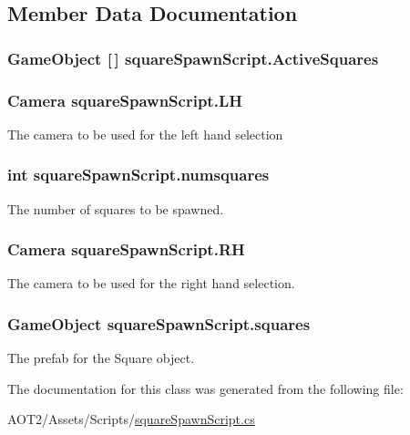 \subsection{Member Data Documentation}
\hypertarget{classsquare_spawn_script_a0e6aed8ea0e260ec6dc7a811801b859d}{
\subsubsection[{Active\-Squares}]{\setlength{\rightskip}{0pt plus 5cm}Game\-Object \mbox{[}$\,$\mbox{]} square\-Spawn\-Script.\-Active\-Squares}}\label{classsquare_spawn_script_a0e6aed8ea0e260ec6dc7a811801b859d}
\hypertarget{classsquare_spawn_script_abf8f64837c29453bfe6231d48b06b483}{
\subsubsection[{L\-H}]{\setlength{\rightskip}{0pt plus 5cm}Camera square\-Spawn\-Script.\-L\-H}}\label{classsquare_spawn_script_abf8f64837c29453bfe6231d48b06b483}
The camera to be used for the left hand selection \hypertarget{classsquare_spawn_script_aee81b01036a29f961a113a21183173e3}{
\subsubsection[{numsquares}]{\setlength{\rightskip}{0pt plus 5cm}int square\-Spawn\-Script.\-numsquares}}\label{classsquare_spawn_script_aee81b01036a29f961a113a21183173e3}
The number of squares to be spawned. \hypertarget{classsquare_spawn_script_acc39770a5d684a4b5e1057b832dc979d}{
\subsubsection[{R\-H}]{\setlength{\rightskip}{0pt plus 5cm}Camera square\-Spawn\-Script.\-R\-H}}\label{classsquare_spawn_script_acc39770a5d684a4b5e1057b832dc979d}
The camera to be used for the right hand selection. \hypertarget{classsquare_spawn_script_a353637659973cde399b46b194b30eb2e}{
\subsubsection[{squares}]{\setlength{\rightskip}{0pt plus 5cm}Game\-Object square\-Spawn\-Script.\-squares}}\label{classsquare_spawn_script_a353637659973cde399b46b194b30eb2e}
The prefab for the Square object. 

The documentation for this class was generated from the following file\-:\begin{DoxyCompactItemize}
\item 
A\-O\-T2/\-Assets/\-Scripts/\hyperlink{square_spawn_script_8cs}{square\-Spawn\-Script.\-cs}\end{DoxyCompactItemize}
